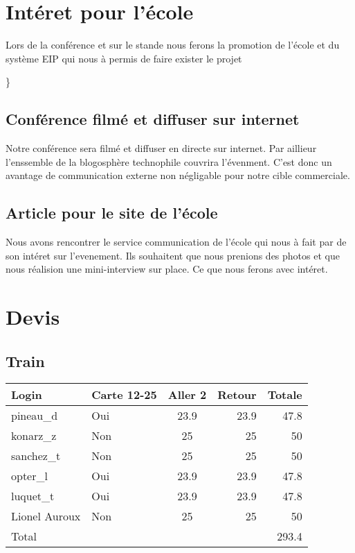 \documentclass{rtxreport}
\begin{document}
\chapter{Intéret pour l'école}
Lors de la conférence et sur le stande nous ferons la promotion de l'école et du système EIP qui nous à permis de faire exister le projet {\rtx\}

\section{Conférence filmé et diffuser sur internet}
Notre conférence sera filmé et diffuser en directe sur internet. Par aillieur l'enssemble de la blogosphère technophile couvrira l'évenment. C'est donc un avantage de communication externe non négligable pour notre cible commerciale.

\section{Article pour le site de l'école} 

Nous avons rencontrer le service communication de l'école qui nous à fait par de son intéret sur l'evenement. Ils souhaitent que nous prenions des photos et que nous réalision une mini-interview sur place. Ce que nous ferons avec intéret.

\chapter{Devis}

\section{Train}

\begin{tabular}{|l|l|c|r|r}
  \hline
  Login &  Carte 12-25 & Aller 2 & Retour & Totale \\
  \hline
  pineau_d & Oui & 23.9 & 23.9 & 47.8 \\
  konarz_z & Non & 25 & 25 & 50 \\
  sanchez_t & Non & 25 & 25 & 50 \\
  opter_l & Oui & 23.9 & 23.9 & 47.8 \\
  luquet_t & Oui & 23.9 & 23.9 & 47.8 \\
  Lionel Auroux & Non & 25 & 25 & 50  \\
  Total & & & & 293.4 \\
  \hline


\end{tabular}}
\end{document}
